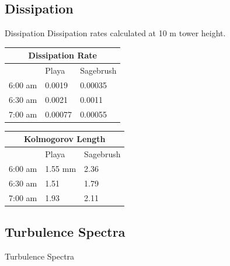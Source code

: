 \documentclass{beamer}
\begin{document}

\subsection{Dissipation}
\begin{frame}{Dissipation}
Dissipation rates calculated at 10 m tower height.
\begin{table}
\begin{minipage}[b]{0.45\linewidth}
\centering
\begin{tabular}{| p || p | p |}
	\hline
	\multicolumn{3}{|c|}{Dissipation Rate} \\
	\hline
	& Playa & Sagebrush \\
	\hline
	6:00 am & 0.0019 & 0.00035 \\
	6:30 am & 0.0021 & 0.0011 \\
	7:00 am & 0.00077 & 0.00055 \\
	\hline
\end{tabular}
\end{minipage}%
\begin{minipage}[b]{0.45\linewidth}
\centering
\begin{tabular}{| p || p | p |}
	\hline
	\multicolumn{3}{|c|}{Kolmogorov Length} \\
	\hline
	& Playa & Sagebrush \\
	\hline
	6:00 am & 1.55 mm & 2.36 \\
	6:30 am & 1.51 & 1.79 \\
	7:00 am & 1.93 & 2.11 \\
	\hline
\end{tabular}
\end{minipage}%
\end{table}
\end{frame}

\subsection{Turbulence Spectra}
\begin{frame}{Turbulence Spectra}

\end{frame}




\end{document}
